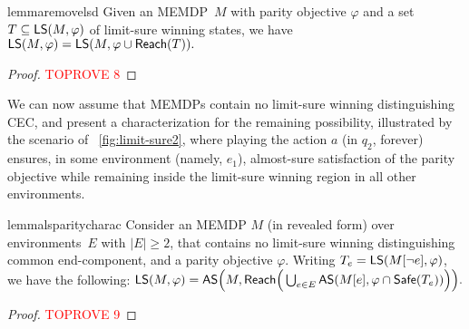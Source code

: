 \documentclass[a4paper,USenglish,cleveref, autoref, thm-restate]{lipics-v2021}
\def\abs#1{\ensuremath{\lvert #1 \rvert}}
\newcommand\almostsure{\textrm{\sf AS}}
\newcommand\limitsure{\textrm{\sf LS}}
\newcommand\Safe{\textrm{\sf Safe}}
\newcommand\Reach{\textrm{\sf Reach}}
\begin{document}
\begin{restatable}{lemma}{removelsd}
\label{lemma:remove-lsd}
	Given an MEMDP~$M$ with parity objective $\varphi$
	and a set $T \subseteq \limitsure(M, \varphi)$ of limit-sure winning states, 
	we have
	\(\limitsure(M, \varphi) = \limitsure(M, \varphi \cup \Reach(T)).\)
\end{restatable}

\begin{proof}\textcolor{red}{TOPROVE 8}\end{proof}

We can now assume that MEMDPs contain no limit-sure winning distinguishing CEC,
and present a characterization for the remaining possibility, illustrated by the scenario of 
\figurename~\ref{fig:limit-sure2}, where playing the action $a$ (in $q_2$, forever) 
ensures, in some environment (namely, $e_1$), almost-sure satisfaction of 
the parity objective while remaining inside the limit-sure winning region in all other environments. 

\begin{restatable}{lemma}{lsparitycharac}
\label{lemma:ls-parity-charac}
Consider an MEMDP $M$ (in revealed form) over environments~$E$ with $\abs{E} \geq 2$,
that contains no limit-sure winning distinguishing common end-component, and a parity objective $\varphi$. 
Writing $T_e = \limitsure(M[\lnot e], \varphi)$, we have the following:
\(
   \limitsure(M, \varphi) = \almostsure\Big(M, \Reach\Big(\bigcup_{e \in E} \almostsure(M[e], \varphi \cap \Safe(T_e)) \Big)\Big).
\)

\end{restatable}


\begin{proof}\textcolor{red}{TOPROVE 9}\end{proof}
\end{document}
